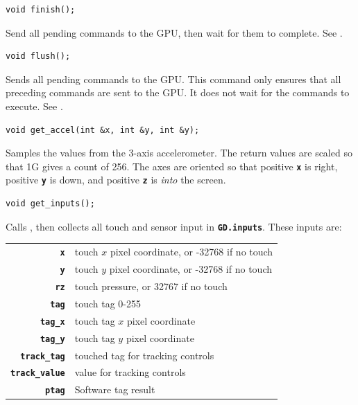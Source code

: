 \documentclass[10pt]{book}
\newcommand{\mach}[1]{\texttt{\textbf{#1}}}
\begin{document}
\begin{CJK}{UTF8}{gkai}
\begin{framed}
\begin{verbatim}
void finish();
\end{verbatim}
\end{framed}

Send all pending commands to the GPU, then wait for them to complete.
See .

\newpage
{}

\begin{framed}
\begin{verbatim}
void flush();
\end{verbatim}
\end{framed}

Sends all pending commands to the GPU.
This command only ensures that all preceding commands are sent to the GPU.
It does not wait for the commands to execute. See .


\begin{framed}
\begin{verbatim}
void get_accel(int &x, int &y, int &y);
\end{verbatim}
\end{framed}

Samples the values from the 3-axis accelerometer.
The return values are scaled so that 1G gives a count of 256.
The axes are oriented so that positive \mach{x} is right,
positive \mach{y} is down, and positive \mach{z} is \emph{into} the screen.


\begin{framed}
\begin{verbatim}
void get_inputs();
\end{verbatim}
\end{framed}

Calls , then
collects all touch and sensor input in \mach{GD.inputs}.
These inputs are:

\vspace{10pt}
\begin{tabular}{rl}
\mach{x} & touch $x$ pixel coordinate, or -32768 if no touch \\
\mach{y} & touch $y$ pixel coordinate, or -32768 if no touch \\
\mach{rz} & touch pressure, or 32767 if no touch \\
\mach{tag} & touch tag 0-255 \\
\mach{tag\_x} & touch tag $x$ pixel coordinate \\
\mach{tag\_y} & touch tag $y$ pixel coordinate \\
\mach{track\_tag} & touched tag for tracking controls \\
\mach{track\_value} & value for tracking controls \\
\mach{ptag} & Software tag result \\
\end{tabular}


\end{CJK}
\end{document}
